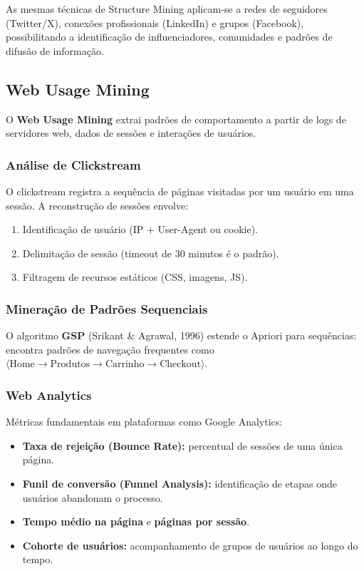 \documentclass[12pt,a4paper]{article}
\begin{document}
As mesmas técnicas de Structure Mining aplicam-se a redes de seguidores (Twitter/X), conexões profissionais (LinkedIn) e grupos (Facebook), possibilitando a identificação de influenciadores, comunidades e padrões de difusão de informação.

\subsection{Web Usage Mining}

O \textbf{Web Usage Mining} extrai padrões de comportamento a partir de logs de servidores web, dados de sessões e interações de usuários.

\subsubsection{Análise de Clickstream}

O clickstream registra a sequência de páginas visitadas por um usuário em uma sessão. A reconstrução de sessões envolve:
\begin{enumerate}
  \item Identificação de usuário (IP + User-Agent ou cookie).
  \item Delimitação de sessão (timeout de 30 minutos é o padrão).
  \item Filtragem de recursos estáticos (CSS, imagens, JS).
\end{enumerate}

\subsubsection{Mineração de Padrões Sequenciais}

O algoritmo \textbf{GSP} (Srikant \& Agrawal, 1996) estende o Apriori para sequências: encontra padrões de navegação frequentes como $\langle \text{Home} \to \text{Produtos} \to \text{Carrinho} \to \text{Checkout} \rangle$.

\subsubsection{Web Analytics}

Métricas fundamentais em plataformas como Google Analytics:
\begin{itemize}
  \item \textbf{Taxa de rejeição (Bounce Rate):} percentual de sessões de uma única página.
  \item \textbf{Funil de conversão (Funnel Analysis):} identificação de etapas onde usuários abandonam o processo.
  \item \textbf{Tempo médio na página} e \textbf{páginas por sessão}.
  \item \textbf{Cohorte de usuários:} acompanhamento de grupos de usuários ao longo do tempo.
\end{itemize}
\end{document}
